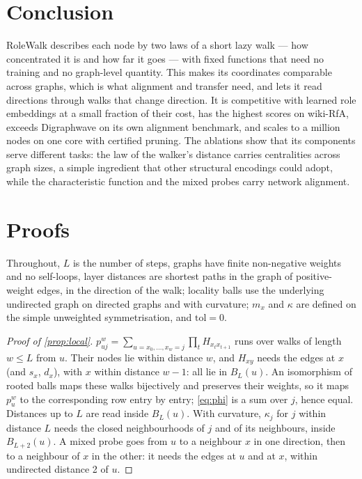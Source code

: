 \documentclass[10pt]{article}
\theoremstyle{definition}
\newcommand{\tol}{\mathrm{tol}}
\begin{document}
\section{Conclusion}

RoleWalk describes each node by two laws of a short lazy walk --- how concentrated it is and how far it goes --- with fixed functions that need no training and no graph-level quantity.
This makes its coordinates comparable across graphs, which is what alignment and transfer need, and lets it read directions through walks that change direction.
It is competitive with learned role embeddings at a small fraction of their cost, has the highest scores on wiki-RfA, exceeds Digraphwave on its own alignment benchmark, and scales to a million nodes on one core with certified pruning.
The ablations show that its components serve different tasks: the law of the walker's distance carries centralities across graph sizes, a simple ingredient that other structural encodings could adopt, while the characteristic function and the mixed probes carry network alignment.




\clearpage
\appendix
\section{Proofs}\label{app:proofs}

Throughout, $L$ is the number of steps, graphs have finite non-negative weights and no self-loops, layer distances are shortest paths in the graph of positive-weight edges, in the direction of the walk; locality balls use the underlying undirected graph on directed graphs and with curvature; $m_x$ and $\kappa$ are defined on the simple unweighted symmetrisation, and $\tol=0$.

\begin{proof}[Proof of \cref{prop:local}]
$p^w_{uj} = \sum_{u=x_0,\dots,x_w=j}\prod_t H_{x_tx_{t+1}}$ runs over walks of length $w\le L$ from $u$.
Their nodes lie within distance $w$, and $H_{xy}$ needs the edges at $x$ (and $s_x$, $d_x$), with $x$ within distance $w-1$: all lie in $B_L(u)$.
An isomorphism of rooted balls maps these walks bijectively and preserves their weights, so it maps $p^w_u$ to the corresponding row entry by entry; \eqref{eq:phi} is a sum over $j$, hence equal. Distances up to $L$ are read inside $B_L(u)$.
With curvature, $\kappa_j$ for $j$ within distance $L$ needs the closed neighbourhoods of $j$ and of its neighbours, inside $B_{L+2}(u)$.
A mixed probe goes from $u$ to a neighbour $x$ in one direction, then to a neighbour of $x$ in the other: it needs the edges at $u$ and at $x$, within undirected distance 2 of $u$.
\end{proof}
\end{document}
